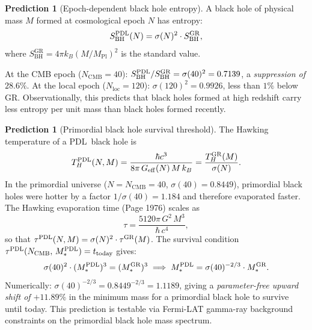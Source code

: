 \documentclass[11pt,a4paper]{article}
\theoremstyle{definition}
\newtheorem{prediction}[theorem]{Prediction}
\newcommand{\PDL}{\textnormal{PDL}}
\newcommand{\sig}{\sigma}
\newcommand{\Geff}{G_{\mathrm{eff}}}
\newcommand{\hb}{\hbar}
\newcommand{\SBH}{S_{\mathrm{BH}}}
\newcommand{\MPl}{M_{\mathrm{Pl}}}
\begin{document}
\begin{prediction}[Epoch-dependent black hole entropy]
\label{pred:entropy_epoch}
A black hole of physical mass $M$ formed at cosmological epoch $N$ has entropy:
\begin{equation}
\SBH^\PDL(N) = \sig(N)^2 \cdot \SBH^\mathrm{GR},
\label{eq:entropy_epoch}
\end{equation}
where $\SBH^\mathrm{GR} = 4\pi k_B (M/\MPl)^2$ is the standard value.

At the CMB epoch ($N_\mathrm{CMB} = 40$):
$\SBH^\PDL/\SBH^\mathrm{GR} = \sig(40)^2 = 0.7139$, a \emph{suppression of
$28.6\%$}. At the local epoch ($N_\mathrm{loc} = 120$):
$\sig(120)^2 = 0.9926$, less than $1\%$ below GR. Observationally, this
predicts that black holes formed at high redshift carry less entropy per unit
mass than black holes formed recently.
\end{prediction}

\begin{prediction}[Primordial black hole survival threshold]
\label{pred:PBH}
The Hawking temperature of a \PDL\ black hole is
\begin{equation}
T_H^\PDL(N,M) = \frac{\hb c^3}{8\pi\,\Geff(N)\,M\,k_B}
= \frac{T_H^\mathrm{GR}(M)}{\sig(N)}.
\label{eq:TH}
\end{equation}
In the primordial universe ($N = N_\mathrm{CMB} = 40$, $\sig(40) = 0.8449$),
primordial black holes were hotter by a factor $1/\sig(40) = 1.184$ and
therefore evaporated faster. The Hawking evaporation time (Page 1976) scales as
\begin{equation}
\tau = \frac{5120\pi\,G^2\,M^3}{\hb\,c^4},
\label{eq:tau}
\end{equation}
so that $\tau^\PDL(N,M) = \sig(N)^2\cdot\tau^\mathrm{GR}(M)$.
The survival condition $\tau^\PDL(N_\mathrm{CMB},\,M_*^\PDL) = t_\mathrm{today}$
gives:
\begin{equation}
\sig(40)^2\cdot(M_*^\PDL)^3 = (M_*^\mathrm{GR})^3
\implies
M_*^\PDL = \sig(40)^{-2/3}\cdot M_*^\mathrm{GR}.
\label{eq:Mstar}
\end{equation}
Numerically: $\sig(40)^{-2/3} = 0.8449^{-2/3} = 1.1189$, giving a
\emph{parameter-free upward shift of $+11.89\%$} in the minimum mass for
a primordial black hole to survive until today. This prediction is testable
via Fermi-LAT gamma-ray background constraints on the primordial black hole
mass spectrum.
\end{prediction}
\end{document}
